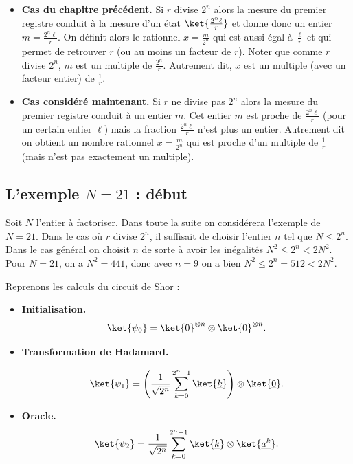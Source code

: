 \documentclass[11pt,class=report,crop=false]{standalone}
\begin{document}
\begin{itemize}
  \item \textbf{Cas du chapitre précédent.} Si $r$ divise $2^n$ alors la mesure du premier registre conduit à la mesure d'un état $\ket{\frac{2^n\ell}{r}}$ et donne donc un entier $m = \frac{2^n\ell}{r}$.  
  On définit alors le rationnel $x = \frac{m}{2^n}$ qui est aussi égal à $\frac{\ell}{r}$ et qui permet de retrouver $r$ (ou au moins un facteur de $r$).   
  Noter que comme $r$ divise $2^n$, $m$ est un multiple de $\frac{2^n}{r}$. Autrement dit, $x$ est un multiple (avec un facteur entier) de $\frac 1r$.

  \item \textbf{Cas considéré maintenant.} Si $r$ ne divise pas $2^n$ alors la mesure du premier registre conduit à un entier $m$. Cet entier $m$ est proche de $\frac{2^n\ell}{r}$ (pour un certain entier $\ell$) mais la fraction $\frac{2^n\ell}{r}$ n'est plus un entier.
  Autrement dit on obtient un nombre rationnel $x = \frac{m}{2^n}$ qui est proche d'un multiple de $\frac1r$ (mais n'est pas exactement un multiple).
\end{itemize}


\subsection{L'exemple $N=21$ : début}


Soit $N$ l'entier à factoriser. Dans toute la suite on considérera l'exemple de $N=21$.
Dans le cas où $r$ divise $2^n$, il suffisait de choisir l'entier $n$ tel que $N \le 2^n$. Dans le cas général on choisit $n$ de sorte à avoir les inégalités $N^2 \le 2^n < 2N^2$.
Pour $N=21$, on a $N^2 = 441$, donc avec $n=9$ on a bien $N^2 \le 2^n = 512 < 2N^2$. 

Reprenons les calculs du circuit de Shor :
\begin{itemize}
  \item \textbf{Initialisation.}
$$\ket{\psi_0} = \ket{0}^{\otimes n} \otimes \ket{0}^{\otimes n}.$$

\item \textbf{Transformation de Hadamard.} 

$$\ket{\psi_1} 
= \left(\frac{1}{\sqrt{2^n}} \sum_{k=0}^{2^n-1} \ket{\underline{k}} \right) \otimes \ket{\underline{0}}.$$

  \item \textbf{Oracle.}
  $$\ket{\psi_2} = \frac{1}{\sqrt{2^n}} \sum_{k=0}^{2^n-1} \ket{\underline{k}} \otimes \ket{\underline {a^k}}.$$
\end{itemize}
\end{document}
